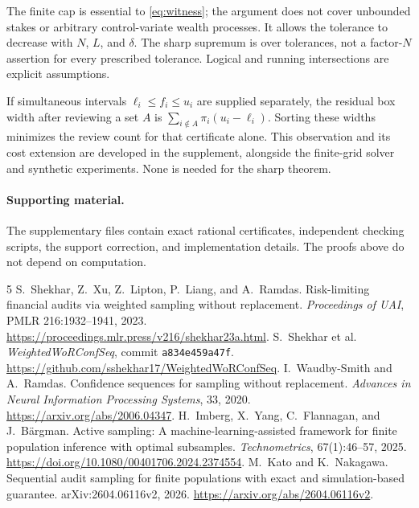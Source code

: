 \documentclass[11pt]{article}
\begin{document}
The finite cap is essential to \eqref{eq:witness}; the argument does not
cover unbounded stakes or arbitrary control-variate wealth processes.
It allows the tolerance to decrease with $N$, $L$, and $\delta$. The sharp
supremum is over tolerances, not a factor-$N$ assertion for every prescribed
tolerance. Logical and running intersections are explicit assumptions.

If simultaneous intervals $\ell_i\le f_i\le u_i$ are supplied separately,
the residual box width after reviewing a set $A$ is
$\sum_{i\notin A}\pi_i(u_i-\ell_i)$. Sorting these widths minimizes the
review count for that certificate alone. This observation and its cost
extension are developed in the supplement, alongside the finite-grid solver
and synthetic experiments. None is needed for the sharp theorem.

\paragraph{Supporting material.}
The supplementary files contain exact rational certificates, independent
checking scripts, the support correction, and implementation details. The
proofs above do not depend on computation.

\begingroup\small\raggedright
\begin{thebibliography}{5}
S.~Shekhar, Z.~Xu, Z.~Lipton, P.~Liang, and A.~Ramdas.
Risk-limiting financial audits via weighted sampling without replacement.
\emph{Proceedings of UAI}, PMLR 216:1932--1941, 2023.
\url{https://proceedings.mlr.press/v216/shekhar23a.html}.
S.~Shekhar et al. \emph{WeightedWoRConfSeq}, commit \texttt{a834e459a47f}.
\url{https://github.com/sshekhar17/WeightedWoRConfSeq}.
I.~Waudby-Smith and A.~Ramdas. Confidence sequences for sampling without replacement.
\emph{Advances in Neural Information Processing Systems}, 33, 2020.
\url{https://arxiv.org/abs/2006.04347}.
H.~Imberg, X.~Yang, C.~Flannagan, and J.~B\"argman.
Active sampling: A machine-learning-assisted framework for finite population
inference with optimal subsamples. \emph{Technometrics}, 67(1):46--57, 2025.
\url{https://doi.org/10.1080/00401706.2024.2374554}.
M.~Kato and K.~Nakagawa. Sequential audit sampling for finite populations with
exact and simulation-based guarantee. arXiv:2604.06116v2, 2026.
\url{https://arxiv.org/abs/2604.06116v2}.
\end{thebibliography}
\endgroup
\end{document}
